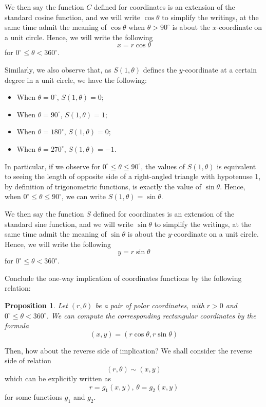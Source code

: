 \documentclass[12pt]{article}
\newtheorem*{proposition}{Proposition}
\begin{document}
    We then say the function $C$ defined for coordinates is an extension of the standard cosine function, and we will write $\cos{\theta}$ to simplify the writings, at the same time admit the meaning of $\cos{\theta}$ when $\theta>90^\circ$ is about the $x$-coordinate on a unit circle. Hence, we will write the following $$x=r\cos{\theta}$$ for $0^\circ\leq \theta < 360^\circ$.

    Similarly, we also observe that, as $S(1,\theta)$ defines the $y$-coordinate at a certain degree in a unit circle, we have the following:\begin{itemize}
        \item When $\theta=0^\circ$, $S(1,\theta)=0$;
        \item When $\theta=90^\circ$, $S(1,\theta)=1$;
        \item When $\theta=180^\circ$, $S(1,\theta)=0$;
        \item When $\theta=270^\circ$, $S(1,\theta)=-1$.
    \end{itemize}

    In particular, if we observe for $0^\circ \leq \theta \leq 90^\circ$, the values of $S(1,\theta)$ is equivalent to seeing the length of opposite side of a right-angled triangle with hypotenuse 1, by definition of trigonometric functions, is exactly the value of $\sin{\theta}$. Hence, when $0^\circ\leq \theta\leq 90^\circ$, we can write $S(1,\theta)=\sin{\theta}$.

    We then say the function $S$ defined for coordinates is an extension of the standard sine function, and we will write $\sin{\theta}$ to simplify the writings, at the same time admit the meaning of $\sin{\theta}$ is about the $y$-coordinate on a unit circle. Hence, we will write the following $$y=r\sin{\theta}$$ for $0^\circ\leq \theta < 360^\circ$.

    Conclude the one-way implication of coordinates functions by the following relation: 

    \begin{proposition}
        Let $(r,\theta)$ be a pair of polar coordinates, with $r>0$ and $0^\circ\leq \theta<360^\circ$. We can compute the corresponding rectangular coordinates by the formula \[(x,y)=(r\cos{\theta},r\sin{\theta})\]
    \end{proposition}

    Then, how about the reverse side of implication? We shall consider the reverse side of relation \[(r,\theta)\sim (x,y)\] which can be explicitly written as \[r=g_1(x,y), \, \theta=g_2(x,y)\] for some functions $g_1$ and $g_2$.
\end{document}
